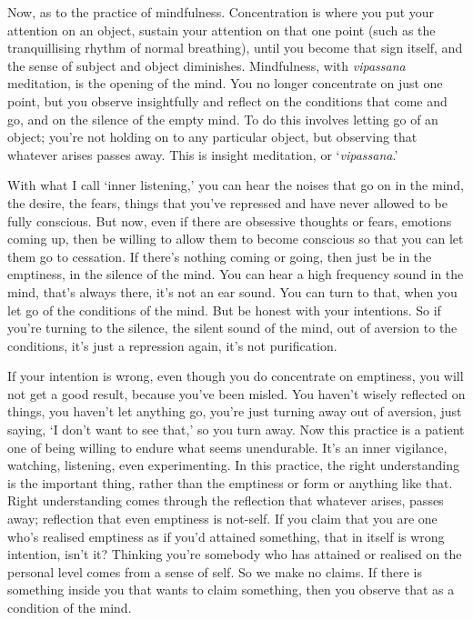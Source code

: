 
Now, as to the practice of mindfulness. Concentration is where you put your attention on an object, sustain your attention on that one point (such as the tranquillising rhythm of normal breathing), until you become that sign itself, and the sense of subject and object diminishes. Mindfulness, with \textit{vipassana} meditation, is the opening of the mind. You no longer concentrate on just one point, but you observe insightfully and reflect on the conditions that come and go, and on the silence of the empty mind. To do this involves letting go of an object; you're not holding on to any particular object, but observing that whatever arises passes away. This is insight meditation, or `\textit{vipassana}.'

With what I call `inner listening,' you can hear the noises that go on in the mind, the desire, the fears, things that you've repressed and have never allowed to be fully conscious. But now, even if there are obsessive thoughts or fears, emotions coming up, then be willing to allow them to become conscious so that you can let them go to cessation. If there's nothing coming or going, then just be in the emptiness, in the silence of the mind. You can hear a high frequency sound in the mind, that's always there, it's not an ear sound. You can turn to that, when you let go of the conditions of the mind. But be honest with your intentions. So if you're turning to the silence, the silent sound of the mind, out of aversion to the conditions, it's just a repression again, it's not purification.

If your intention is wrong, even though you do concentrate on emptiness, you will not get a good result, because you've been misled. You haven't wisely reflected on things, you haven't let anything go, you're just turning away out of aversion, just saying, `I don't want to see that,' so you turn away. Now this practice is a patient one of being willing to endure what seems unendurable. It's an inner vigilance, watching, listening, even experimenting. In this practice, the right understanding is the important thing, rather than the emptiness or form or anything like that. Right understanding comes through the reflection that whatever arises, passes away; reflection that even emptiness is not-self. If you claim that you are one who's realised emptiness as if you'd attained something, that in itself is wrong intention, isn't it? Thinking you're somebody who has attained or realised on the personal level comes from a sense of self. So we make no claims. If there is something inside you that wants to claim something, then you observe that as a condition of the mind.

